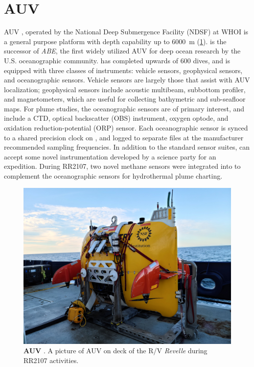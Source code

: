 \section{AUV \Sentry}
AUV \Sentry, operated by the National Deep Submergence Facility (NDSF) at WHOI\autocite{kaiser2016design} is a general purpose platform with depth capability up to \SI{6000}{\meter} (\cref{fig:ops_sentry}). \Sentry is the successor of \emph{ABE}\autocite{yoerger1991autonomous}, the first widely utilized AUV for deep ocean research by the U.S. oceanographic community. \Sentry has completed upwards of 600 dives, and is equipped with three classes of instruments: vehicle sensors, geophysical sensors, and oceanographic sensors. Vehicle sensors are largely those that assist with AUV localization; geophysical sensors include acoustic multibeam, subbottom profiler, and magnetometers, which are useful for collecting bathymetric and sub-seafloor maps. For plume studies, the oceanographic sensors are of primary interest, and include a CTD, optical backscatter (OBS) instrument, oxygen optode, and oxidation reduction-potential (ORP) sensor. Each oceanographic sensor is synced to a shared precision clock on \Sentry, and logged to separate files at the manufacturer recommended sampling frequencies. In addition to the standard sensor suites, \Sentry can accept some novel instrumentation developed by a science party for an expedition. During RR2107, two novel methane sensors were integrated into \Sentry to complement the oceanographic sensors for hydrothermal plume charting\autocite{michel2022gas,kapit2021dissolved,kapit2021measurement}.

\begin{figure}[h!]
  \centering
  \includegraphics[width=0.8\columnwidth]{figures/ops_sentry.jpg}
  \caption[AUV \Sentry]{\textbf{AUV \Sentry}. A picture of AUV \Sentry on deck of the R/V \emph{Revelle} during RR2107 activities.}
  \label{fig:ops_sentry}
\end{figure}

